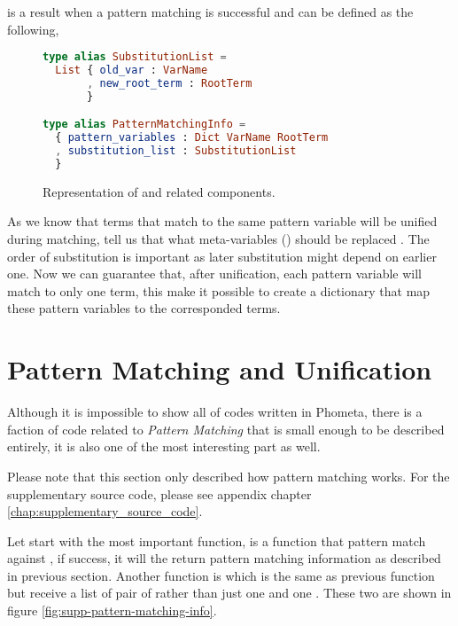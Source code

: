 \documentclass[master.tex]{subfiles}
\begin{document}
 is a result when a pattern matching is successful
and can be defined as the following,


\begin{figure}[H]
\begin{framed}
\begin{lstlisting}[language=elm]
type alias SubstitutionList =
  List { old_var : VarName
       , new_root_term : RootTerm
       }

type alias PatternMatchingInfo =
  { pattern_variables : Dict VarName RootTerm
  , substitution_list : SubstitutionList
  }
\end{lstlisting}
\end{framed}
\caption{Representation of  and related components.}
\label{fig:implementation-repo-pattern-matching-info}
\end{figure}

As we know that terms that match to the same pattern variable will be unified
during matching,  tell us that what meta-variables
() should be replaced . The order of
substitution is important as later substitution might depend on earlier one. Now
we can guarantee that, after unification, each pattern variable will match to
only one term, this make it possible to create a dictionary
 that map these pattern variables to the corresponded
terms.

\section{Pattern Matching and Unification}
Although it is impossible to show all of codes written in Phometa, there is a
faction of code related to \emph{Pattern Matching} that is small enough to be
described entirely, it is also one of the most interesting part as well.

Please note that this section only described how pattern matching works. For the
supplementary source code, please see appendix chapter
\ref{chap:supplementary_source_code}.

Let start with the most important function,  is a function
that pattern match  against , if success, it will
the return pattern matching information as described in previous section.
Another function is  which is the same as
previous function but receive a list of pair of  rather
than just one  and one . These two are shown in
figure \ref{fig:supp-pattern-matching-info}.
\end{document}

